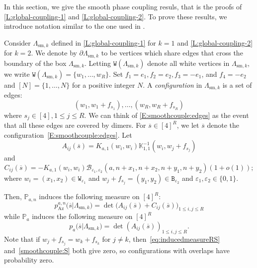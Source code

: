 \documentclass[11pt,twoside]{amsart}
\theoremstyle{plain}
\numberwithin{quest}{section}
\theoremstyle{remark}
\numberwithin{rem}{section}
\theoremstyle{definition}
\newcommand{\eps}{\varepsilon}
\begin{document}
	
	In this section, we give the smooth phase coupling resuls, that is the proofs of \cref{L:global-coupling-1} and \cref{L:global-coupling-2}.  To prove these results, we introduce notation similar to the one used in \cite{BCJ22}.  
	
	
	Consider $\Lambda_{\mathrm{sm},k}$ defined in \cref{L:global-coupling-1} for $k=1$ and \cref{L:global-coupling-2} for $k=2$.  We denote by $\partial\Lambda_{\mathrm{sm},k}$ to be vertices which share edges that cross the boundary of the box $\Lambda_{\mathrm{sm},k}$.  Letting $\mathtt{W}(\Lambda_{\mathrm{sm},k})$ denote all white vertices in $\Lambda_{\mathrm{sm},k}$, we write $\mathtt{W}(\Lambda_{\mathrm{sm},k})=\{w_1,\dots, w_R\}$.  Set $f_1=e_1, f_2=e_2, f_3=-e_1$, and $f_4=-e_2$ and $[N]=\{1,\dots, N\}$ for a positive integer $N$. A \emph{configuration} in  $\Lambda_{\mathrm{sm},k}$ is a  set of edges:
	\begin{equation} \label{E:smoothcouple:edges}
		({w}_1,{w}_1+f_{s_1}),\dots, ({w}_{R},{w}_{R}+f_{s_R})
	\end{equation}
	where $s_j \in[4], 1 \leq j \leq R$.  We can think of \eqref{E:smoothcouple:edges} as the event that all these edges are covered by dimers.   For $\overline{s} \in [4]^{R}$, we let $\overline{s}$ denote the configuration~\eqref{E:smoothcouple:edges}. Let
	\begin{equation*}
		A_{ij}(\overline{s})=K_{a,1}({w}_i,{w}_i)\mathbb{K}^{-1}_{1,1}({w}_i,{w}_j+f_{s_j})
	\end{equation*}
	and 
	\begin{equation*}\label{eq:defCij2}
		C_{ij}(\overline{s})=-K_{a,1}({w}_i,{w}_i)\mathcal{B}_{\eps_1,\eps_2}(a,n+x_1,n+x_2,n+y_1,n+y_2)(1+o(1));
	\end{equation*}
	where $w_i=(x_1,x_2)\in \mathtt{W}_{\eps_1}$ and ${w}_j+f_{s_j}=(y_1,y_2)\in \mathtt{B}_{\eps_2}$ and $\eps_1,\eps_2 \in \{0,1\}$. 
	
	Then, $\mathbb{P}_{a,n}$ induces the following measure on $[4]^R$:
	\begin{equation}\label{eq:inducedmeasureRS}
		p^{a,n}_{\mathrm{Az}}\big(\overline{s}|\Lambda_{\mathrm{sm},k}\big)=\det\big( A_{ij}(\overline{s})+ C_{ij}(\overline{s} )\big)_{1 \leq i,j \leq R } 
	\end{equation}
	while $\mathbb{P}_{a}$ induces the following measure on $[4]^R$ 
	\begin{equation}	
		p_{a}\big(\overline{s}|\Lambda_{\mathrm{sm},k}\big)=\det( A_{ij}(\overline{s}))_{1\leq i,j\leq R}.\label{smoothcouple:S}
	\end{equation}
	Note that if $w_j+f_{s_j}=w_k+f_{s_k}$ for $j\not = k$, then~\eqref{eq:inducedmeasureRS} and~\eqref{smoothcouple:S}  both give zero, so configurations with overlaps have probability zero. 
	
\end{document}
